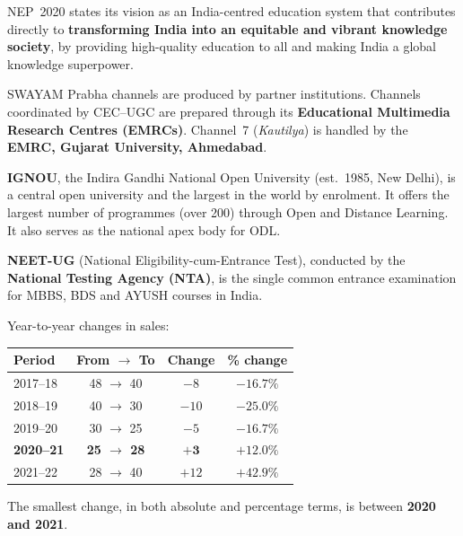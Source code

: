 NEP~2020 states its vision as an India-centred education system that contributes directly to \textbf{transforming India into an equitable and vibrant knowledge society}, by providing high-quality education to all and making India a global knowledge superpower.

SWAYAM Prabha channels are produced by partner institutions. Channels coordinated by CEC--UGC are prepared through its \textbf{Educational Multimedia Research Centres (EMRCs)}. Channel~7 (\emph{Kautilya}) is handled by the \textbf{EMRC, Gujarat University, Ahmedabad}.

\textbf{IGNOU}, the Indira Gandhi National Open University (est.~1985, New Delhi), is a central open university and the largest in the world by enrolment. It offers the largest number of programmes (over 200) through Open and Distance Learning. It also serves as the national apex body for ODL.

\textbf{NEET-UG} (National Eligibility-cum-Entrance Test), conducted by the \textbf{National Testing Agency (NTA)}, is the single common entrance examination for MBBS, BDS and AYUSH courses in India.

Year-to-year changes in sales:
\begin{center}\small
\begin{tabular}{lccc}\toprule
Period & From $\rightarrow$ To & Change & \% change\\\midrule
2017--18 & 48 $\rightarrow$ 40 & $-8$ & $-16.7\%$\\
2018--19 & 40 $\rightarrow$ 30 & $-10$ & $-25.0\%$\\
2019--20 & 30 $\rightarrow$ 25 & $-5$ & $-16.7\%$\\
\textbf{2020--21} & \textbf{25 $\rightarrow$ 28} & $\mathbf{+3}$ & $\mathbf{+12.0\%}$\\
2021--22 & 28 $\rightarrow$ 40 & $+12$ & $+42.9\%$\\\bottomrule
\end{tabular}
\end{center}
The smallest change, in both absolute and percentage terms, is between \textbf{2020 and 2021}.

